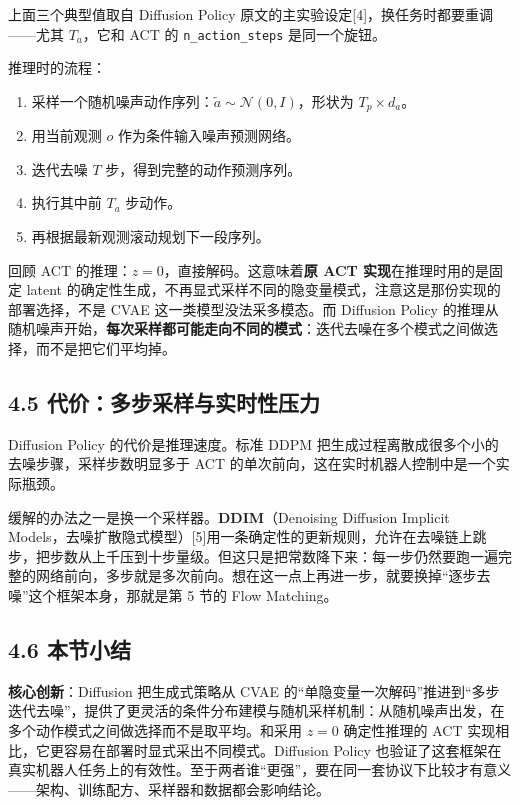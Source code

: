 \documentclass[
  chinese,
]{ctexart}
\providecommand{\tightlist}{%
  \setlength{\itemsep}{0pt}\setlength{\parskip}{0pt}}
\begin{document}
上面三个典型值取自 Diffusion Policy
原文的主实验设定{[}4{]}，换任务时都要重调------尤其 \(T_a\)，它和 ACT 的
\texttt{n\_action\_steps} 是同一个旋钮。

推理时的流程：

\begin{enumerate}
\def\labelenumi{\arabic{enumi}.}
\tightlist
\item
  采样一个随机噪声动作序列：\(\tilde{a} \sim \mathcal{N}(0, I)\)，形状为
  \(T_p \times d_a\)。
\item
  用当前观测 \(o\) 作为条件输入噪声预测网络。
\item
  迭代去噪 \(T\) 步，得到完整的动作预测序列。
\item
  执行其中前 \(T_a\) 步动作。
\item
  再根据最新观测滚动规划下一段序列。
\end{enumerate}

回顾 ACT 的推理：\(z = 0\)，直接解码。这意味着\textbf{原 ACT
实现}在推理时用的是固定 latent
的确定性生成，不再显式采样不同的隐变量模式，注意这是那份实现的部署选择，不是
CVAE 这一类模型没法采多模态。而 Diffusion Policy
的推理从随机噪声开始，\textbf{每次采样都可能走向不同的模式}：迭代去噪在多个模式之间做选择，而不是把它们平均掉。

\subsection{4.5
代价：多步采样与实时性压力}\label{ux4ee3ux4ef7ux591aux6b65ux91c7ux6837ux4e0eux5b9eux65f6ux6027ux538bux529b}

Diffusion Policy 的代价是推理速度。标准 DDPM
把生成过程离散成很多个小的去噪步骤，采样步数明显多于 ACT
的单次前向，这在实时机器人控制中是一个实际瓶颈。

缓解的办法之一是换一个采样器。\textbf{DDIM}（Denoising Diffusion
Implicit
Models，去噪扩散隐式模型）{[}5{]}用一条确定性的更新规则，允许在去噪链上跳步，把步数从上千压到十步量级。但这只是把常数降下来：每一步仍然要跑一遍完整的网络前向，多步就是多次前向。想在这一点上再进一步，就要换掉``逐步去噪''这个框架本身，那就是第
5 节的 Flow Matching。

\subsection{4.6 本节小结}\label{ux672cux8282ux5c0fux7ed3-1}

\textbf{核心创新}：Diffusion 把生成式策略从 CVAE
的``单隐变量一次解码''推进到``多步迭代去噪''，提供了更灵活的条件分布建模与随机采样机制：从随机噪声出发，在多个动作模式之间做选择而不是取平均。和采用
\(z = 0\) 确定性推理的 ACT
实现相比，它更容易在部署时显式采出不同模式。Diffusion Policy
也验证了这套框架在真实机器人任务上的有效性。至于两者谁``更强''，要在同一套协议下比较才有意义------架构、训练配方、采样器和数据都会影响结论。
\end{document}

